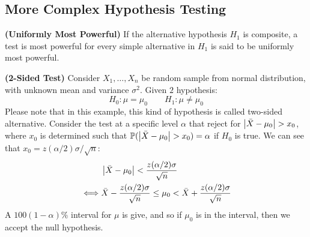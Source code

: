 \subsection{More Complex Hypothesis Testing}

\begin{definition}{\textbf{(Uniformly Most Powerful)}}
    If the alternative hypothesis $H_1$ is composite, a test is most powerful for every simple alternative in $H_1$ is said to be uniformly most powerful. 
\end{definition}

\begin{example}{\textbf{(2-Sided Test)}}
    Consider $X_1,\dots,X_n$ be random sample from normal distribution, with unknown mean and variance $\sigma^2$. Given $2$ hypothesis:
    \begin{equation*}
        H_0 : \mu = \mu_0 \qquad H_1 : \mu \ne \mu_0
    \end{equation*}
    Please note that in this example, this kind of hypothesis is called two-sided alternative. Consider the test at a specific level $\alpha$ that reject for $\left| \bar{X} - \mu_0 \right| > x_0$, where $x_0$ is determined such that $\mathbb{P}(\left| \bar{X} - \mu_0 \right| > x_0) =\alpha$ if $H_0$ is true. We can see that $x_0 = z(\alpha/2)\sigma/\sqrt{n}$:
    \begin{equation*}
    \begin{aligned}
        &\left| \bar{X}-\mu_0 \right| < \frac{z(\alpha/2)\sigma}{\sqrt{n}}\\
        \iff& \bar{X} - \frac{z(\alpha/2)\sigma}{\sqrt{n}} \le \mu_0 < \bar{X} + \frac{z(\alpha/2)\sigma}{\sqrt{n}} \\
    \end{aligned}
    \end{equation*}
    A $100(1-\alpha)\%$ interval for $\mu$ is give, and so if $\mu_0$ is in the interval, then we accept the null hypothesis. 
\end{example}

